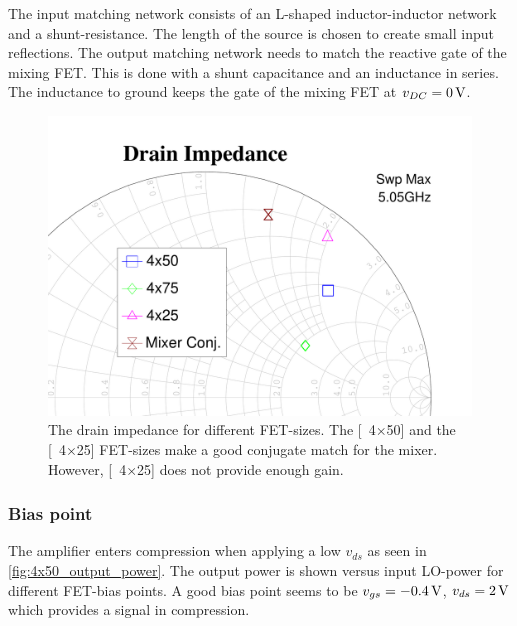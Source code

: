 	The input matching network consists of an L-shaped inductor-inductor network and a shunt-resistance. The length of the source is chosen to create small input reflections. The output matching network needs to match the reactive gate of the mixing FET. This is done with a shunt capacitance and an inductance in series. The inductance to ground keeps the gate of the mixing FET at $v_{DC}=\unit[0]{V}$. 
			\begin{figure}[hbt!]
				\centering
				\includegraphics[width=1.0\textwidth]{fig/amplifiers/lo/FET_size_S22_zoom}
				\caption[Drain impedance for different FET's.]{The drain impedance for different FET-sizes. The \unit[4$\times$50]{\mum} and the \unit[4$\times$25]{\mum} FET-sizes make a good conjugate match for the mixer. However, \unit[4$\times$25]{\mum} does not provide enough gain.} \label{fig:FET_size_S22}
			\end{figure}

		\subsubsection{Bias point}
			The amplifier enters compression when applying a low $v_{ds}$ as seen in \autoref{fig:4x50_output_power}. The output power is shown versus input LO-power for different FET-bias points. A good bias point seems to be $v_{gs}=\unit[-0.4]{V}$, $v_{ds}=\unit[2]{V}$ which provides a signal in compression.

